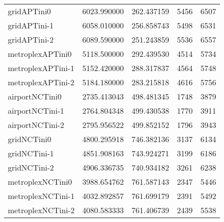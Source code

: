 \begin{table}[h]
\begin{longtable}{lrrrr}
gridAPTini0 & 6023.990000 & 262.437159 & 5456 & 6507 \\
gridAPTini-1 & 6058.010000 & 256.858743 & 5498 & 6531 \\
gridAPTini-2 & 6089.590000 & 251.243859 & 5536 & 6557 \\
metroplexAPTini0 & 5118.500000 & 292.439530 & 4514 & 5734 \\
metroplexAPTini-1 & 5152.420000 & 288.317837 & 4564 & 5748 \\
metroplexAPTini-2 & 5184.180000 & 283.215818 & 4616 & 5756 \\
airportNCTini0 & 2735.413043 & 498.481345 & 1748 & 3879 \\
airportNCTini-1 & 2764.804348 & 499.430538 & 1770 & 3911 \\
airportNCTini-2 & 2795.956522 & 499.852152 & 1796 & 3943 \\
gridNCTini0 & 4800.295918 & 746.382136 & 3137 & 6134 \\
gridNCTini-1 & 4851.908163 & 743.924271 & 3199 & 6186 \\
gridNCTini-2 & 4906.336735 & 740.934182 & 3261 & 6238 \\
metroplexNCTini0 & 3988.654762 & 761.587143 & 2347 & 5446 \\
metroplexNCTini-1 & 4032.892857 & 761.699179 & 2391 & 5492 \\
metroplexNCTini-2 & 4080.583333 & 761.406739 & 2439 & 5538 \\
\end{longtable}
\end{table}

